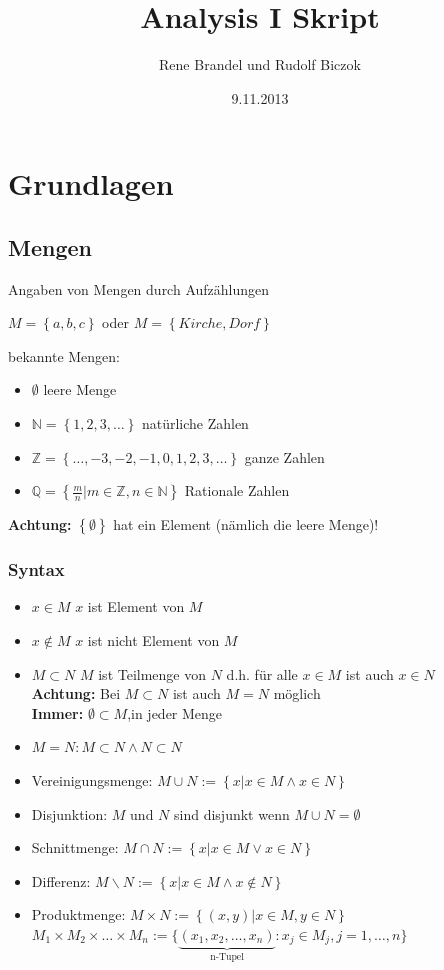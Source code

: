 \documentclass[fleqn]{scrartcl}
\begin{document}
\title{Analysis I Skript}
\date{9.11.2013}
\author{Rene Brandel und Rudolf Biczok}
\maketitle
\section{Grundlagen}

\subsection{Mengen}

Angaben von Mengen durch Aufzählungen

$M=\left\{ a,b,c \right\}$ oder $M=\left\{ Kirche, Dorf\right\}$

bekannte Mengen:
\begin{itemize}
  \item $\emptyset$ leere Menge
  \item $\mathbb{N} = \left\{ 1,2,3,\ldots \right\}$ natürliche Zahlen
  \item $\mathbb{Z} = \left\{ \ldots,-3,-2,-1,0,1,2,3,\ldots \right\}$ ganze Zahlen
  \item $\mathbb{Q} = \left\{ \frac{m}{n}|m \in \mathbb{Z},n \in \mathbb{N} \right\}$ Rationale Zahlen
\end{itemize}

\textbf{Achtung:} $\left\{ \emptyset \right\}$ hat ein Element (nämlich die leere Menge)!

\subsubsection{Syntax}

\begin{itemize}
  \item $x \in M$ $x$ ist Element von $M$
  \item $x \notin M$ $x$ ist nicht Element von $M$
  \item $M \subset N$ $M$ ist Teilmenge von $N$
  d.h. für alle $x \in M$ ist auch $x \in N$ \\
  \textbf{Achtung:} Bei $M \subset N $ ist auch $M = N$ möglich \\
  \textbf{Immer:} $\emptyset \subset M$,in jeder Menge
  \item $M=N: M \subset N \wedge N \subset N$
  \item Vereinigungsmenge: $M \cup N := \left\{ x|x \in M \wedge x \in N\right\}$
  \item Disjunktion: $M$ und $N$ sind disjunkt wenn $M  \cup N = \emptyset$ 
  \item Schnittmenge: $M \cap N := \left\{ x|x \in M \vee x \in N\right\}$ 
  \item Differenz: $M \backslash N := \left\{ x|x \in M \wedge x \notin N \right\}$ 
  \item Produktmenge: $M \times N:= \left\{ (x,y)|x \in M, y \in N \right\}$  \\
  $M_1 \times M_2 \times \ldots \times M_n := \{ \underbrace{(x_1,x_2,\ldots,x_n)}_{\text{n-Tupel}} : x_j \in M_j, j= 1,\ldots,n \}$
\end{itemize}
\end{document}
